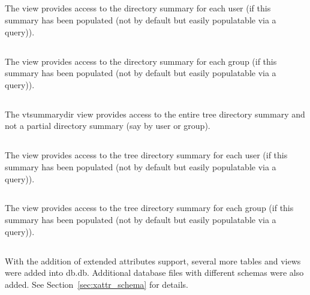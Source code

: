\subsection{\vsummaryuser}
The \vsummaryuser view provides access to the directory summary for
each user (if this summary has been populated (not by default but
easily populatable via a query)).

\subsection{\vsummarygroup}
The \vsummarygroup view provides access to the directory summary for
each group (if this summary has been populated (not by default but
easily populatable via a query)).

\subsection{\vtsummarydir}
The vtsummarydir view provides access to the entire tree directory
summary and not a partial directory summary (say by user or group).

\subsection{\vtsummaryuser}
The \vtsummaryuser view provides access to the tree directory summary
for each user (if this summary has been populated (not by default but
easily populatable via a query)).

\subsection{\vtsummarygroup}
The \vtsummarygroup view provides access to the tree directory summary
for each group (if this summary has been populated (not by default but
easily populatable via a query)).

\subsection{\xattrs}
With the addition of extended attributes support, several more tables
and views were added into db.db. Additional database files with
different schemas were also added. See Section~\ref{sec:xattr_schema}
for details.
